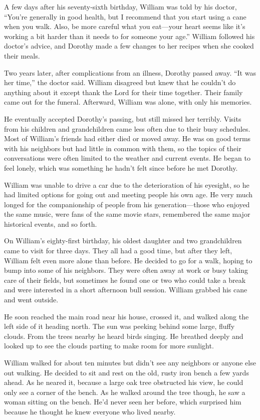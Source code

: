 A few days after his seventy-sixth birthday, William was told by his doctor, “You're generally in good health, but I recommend that you start using a cane when you walk. Also, be more careful what you eat—your heart seems like it's working a bit harder than it needs to for someone your age.” William followed his doctor's advice, and Dorothy made a few changes to her recipes when she cooked their meals.

Two years later, after complications from an illness, Dorothy passed away. “It was her time,” the doctor said. William disagreed but knew that he couldn't do anything about it except thank the Lord for their time together. Their family came out for the funeral. Afterward, William was alone, with only his memories.

He eventually accepted Dorothy's passing, but still missed her terribly. Visits from his children and grandchildren came less often due to their busy schedules. Most of William's friends had either died or moved away. He was on good terms with his neighbors but had little in common with them, so the topics of their conversations were often limited to the weather and current events. He began to feel lonely, which was something he hadn't felt since before he met Dorothy.

William was unable to drive a car due to the deterioration of his eyesight, so he had limited options for going out and meeting people his own age. He very much longed for the companionship of people from his generation—those who enjoyed the same music, were fans of the same movie stars, remembered the same major historical events, and so forth.

On William's eighty-first birthday, his oldest daughter and two grandchildren came to visit for three days. They all had a good time, but after they left, William felt even more alone than before. He decided to go for a walk, hoping to bump into some of his neighbors. They were often away at work or busy taking care of their fields, but sometimes he found one or two who could take a break and were interested in a short afternoon bull session. William grabbed his cane and went outside.

He soon reached the main road near his house, crossed it, and walked along the left side of it heading north. The sun was peeking behind some large, fluffy clouds. From the trees nearby he heard birds singing. He breathed deeply and looked up to see the clouds parting to make room for more sunlight.

William walked for about ten minutes but didn't see any neighbors or anyone else out walking. He decided to sit and rest on the old, rusty iron bench a few yards ahead. As he neared it, because a large oak tree obstructed his view, he could only see a corner of the bench. As he walked around the tree though, he saw a woman sitting on the bench. He'd never seen her before, which surprised him because he thought he knew everyone who lived nearby.

